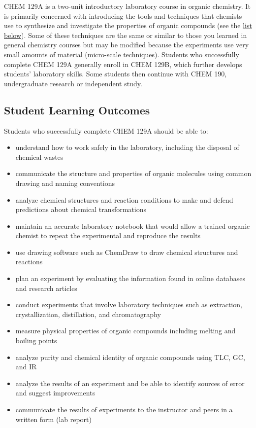 CHEM 129A is a two-unit introductory laboratory course in organic
chemistry. It is primarily concerned with introducing the tools and
techniques that chemists use to synthesize and investigate the
properties of organic compounds (see the \protect\hyperlink{slo}{list
below}). Some of these techniques are the same or similar to those you
learned in general chemistry courses but may be modified because the
experiments use very small amounts of material (micro-scale techniques).
Students who successfully complete CHEM 129A generally enroll in CHEM
129B, which further develops students' laboratory skills. Some students
then continue with CHEM 190, undergraduate research or independent
study.

\hypertarget{slo}{%
\subsection{Student Learning Outcomes}\label{slo}}

Students who successfully complete CHEM 129A should be able to:

\begin{itemize}
\tightlist
\item
  understand how to work safely in the laboratory, including the
  disposal of chemical wastes
\item
  communicate the structure and properties of organic molecules using
  common drawing and naming conventions
\item
  analyze chemical structures and reaction conditions to make and defend
  predictions about chemical transformations
\item
  maintain an accurate laboratory notebook that would allow a trained
  organic chemist to repeat the experimental and reproduce the results
\item
  use drawing software such as ChemDraw to draw chemical structures and
  reactions
\item
  plan an experiment by evaluating the information found in online
  databases and research articles
\item
  conduct experiments that involve laboratory techniques such as
  extraction, crystallization, distillation, and chromatography
\item
  measure physical properties of organic compounds including melting and
  boiling points
\item
  analyze purity and chemical identity of organic compounds using TLC,
  GC, and IR
\item
  analyze the results of an experiment and be able to identify sources
  of error and suggest improvements
\item
  communicate the results of experiments to the instructor and peers in
  a written form (lab report)
\end{itemize}

